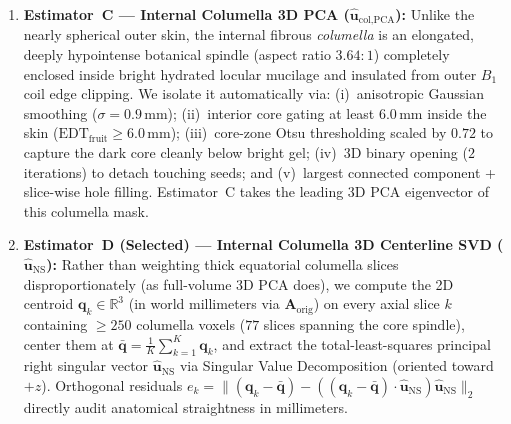 \documentclass[10pt,a4paper]{article}
\renewcommand{\_}{\origunderscore\allowbreak}
\begin{document}
\begin{enumerate}
\begin{itemize}
        \begin{equation}
            \tan\alpha_{\text{slice}} \;=\; \frac{(a^2 - b^2)\sin\theta\cos\theta}{a^2\cos^2\theta + b^2\sin^2\theta}.
            \label{eq:ellipsoid_bias}
        \end{equation}
        Notice the startling consequence: for a sphere ($a = b$), $\tan\alpha_{\text{slice}} = 0$ regardless of $\theta$! Even for our kiwifruit ($a/b \approx 1.12$, $\theta \approx 11.8^\circ$), Equation~\eqref{eq:ellipsoid_bias} predicts $\alpha_{\text{slice}} \approx 2.6^\circ\text{--}4^\circ \ll 11.8^\circ$---underestimating the true tilt by nearly $3\times$! Worse, this exact mismatch between outer-wall centroid drift ($\approx 4^\circ$) and internal core tilt ($\approx 12^\circ$) creates a systematic \textbf{radial eccentricity error} in native axial slices: as $z$ moves toward either pole, the central columella drifts up to $2.0\,\text{mm}$ ($\approx 8.5$ pixels) away from the outer-fruit centroid used by native \texttt{build\_whole\_organ\_geometry()}.
    \end{itemize}
    \item \textbf{Estimator~C --- Internal Columella 3D PCA ($\hat{\mathbf{u}}_{\text{col,PCA}}$):} Unlike the nearly spherical outer skin, the internal fibrous \emph{columella} is an elongated, deeply hypointense botanical spindle (aspect ratio $3.64:1$) completely enclosed inside bright hydrated locular mucilage and insulated from outer $B_1$ coil edge clipping. We isolate it automatically via: (i)~anisotropic Gaussian smoothing ($\sigma = 0.9\,\text{mm}$); (ii)~interior core gating at least $6.0\,\text{mm}$ inside the skin ($\text{EDT}_{\text{fruit}} \ge 6.0\,\text{mm}$); (iii)~core-zone Otsu thresholding scaled by $0.72$ to capture the dark core cleanly below bright gel; (iv)~3D binary opening ($2$ iterations) to detach touching seeds; and (v)~largest connected component + slice-wise hole filling. Estimator~C takes the leading 3D PCA eigenvector of this columella mask.
    \item \textbf{Estimator~D (Selected) --- Internal Columella 3D Centerline SVD ($\hat{\mathbf{u}}_{\text{NS}}$):} Rather than weighting thick equatorial columella slices disproportionately (as full-volume 3D PCA does), we compute the 2D centroid $\mathbf{q}_k \in \mathbb{R}^3$ (in world millimeters via $\mathbf{A}_{\text{orig}}$) on every axial slice $k$ containing $\ge 250$ columella voxels ($77$ slices spanning the core spindle), center them at $\bar{\mathbf{q}} = \frac{1}{K}\sum_{k=1}^K \mathbf{q}_k$, and extract the total-least-squares principal right singular vector $\hat{\mathbf{u}}_{\text{NS}}$ via Singular Value Decomposition (oriented toward $+z$). Orthogonal residuals $e_k = \|(\mathbf{q}_k - \bar{\mathbf{q}}) - ((\mathbf{q}_k - \bar{\mathbf{q}})\cdot\hat{\mathbf{u}}_{\text{NS}})\hat{\mathbf{u}}_{\text{NS}}\|_2$ directly audit anatomical straightness in millimeters.
\end{enumerate}
\end{document}
